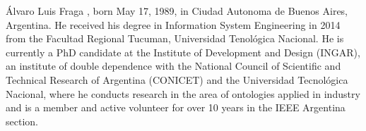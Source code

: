 \documentclass[journal]{IEEEtran}
\begin{document}

%
%
%





% 

\begin{IEEEbiography}{Álvaro Luis Fraga}
 , born May 17, 1989, in Ciudad Autonoma de Buenos Aires, Argentina. He received his degree in Information System Engineering in 2014 from the Facultad Regional Tucuman, Universidad Tenológica Nacional. He is currently a PhD candidate at the Institute of Development and Design (INGAR), an institute of double dependence with the National Council of Scientific and Technical Research of Argentina (CONICET) and the Universidad Tecnológica Nacional, where he conducts research in the area of ontologies applied in industry and is a member and active volunteer for over 10 years in the IEEE Argentina section.
\end{IEEEbiography}
\end{document}
